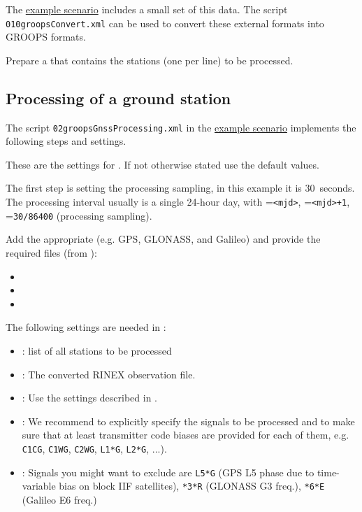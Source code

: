 The \href{https://ftp.tugraz.at/outgoing/ITSG/groops/scenario/scenarioGnssPPP.zip}{example scenario} includes a small set of this data.
The script \verb|010groopsConvert.xml| can be used to convert these external formats into GROOPS formats.

Prepare a  that contains the stations (one per line) to be processed.

\subsection{Processing of a ground station}\label{cookbook.gnssPpp:processing}
The script \verb|02groopsGnssProcessing.xml| in the \href{https://ftp.tugraz.at/outgoing/ITSG/groops/scenario/scenarioGnssPPP.zip}{example scenario}
implements the following steps and settings.

These are the settings for . If not otherwise stated use the default values.

The first step is setting the processing sampling, in this example it is 30~seconds.
The processing interval usually is a single 24-hour day,
 with =\verb|<mjd>|,
=\verb|<mjd>+1|, =\verb|30/86400| (processing sampling).

Add the appropriate  (e.g. GPS, GLONASS, and Galileo)
and provide the required files (from ):
\begin{itemize}
  \item {}
  \item {}
  \item {}
\end{itemize}

The following settings are needed in :
\begin{itemize}
   \item {}: list of all stations to be processed
   \item {}: The converted RINEX observation file.
   \item {}: Use the settings described in .
   \item {}: We recommend to explicitly specify the signals to be processed
            and to make sure that at least transmitter code biases are provided for each of them, e.g. \verb|C1CG|,
            \verb|C1WG|, \verb|C2WG|, \verb|L1*G|, \verb|L2*G|, ...).
   \item {}: Signals you might want to exclude are \verb|L5*G| (GPS L5 phase due to time-variable bias on block IIF satellites), \verb|*3*R| (GLONASS G3 freq.), \verb|*6*E| (Galileo E6 freq.)
\end{itemize}

